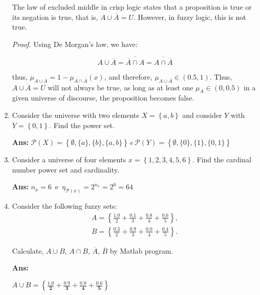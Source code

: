\documentclass{article}
\begin{document}
\begin{enumerate}
        The law of excluded middle in crisp logic states that a proposition is true or its negation is true, that is, \(A \cup \overline{A} = U\). However, in fuzzy logic, this is not true.

        \textit{Proof.} Using De Morgan's law, we have:

        \[
          A \cup \overline{A} = \overline{\overline{A} \cap A} = \overline{A \cap \overline{A}}
        \]

        thus, \({\mu}_{A \cup \overline{A}} = 1 - {\mu}_{{A \cap \overline{A}}}(x)\), and therefore, \({\mu}_{A \cup \overline{A}} \in (0.5, 1)\). Thus, \(A \cup \overline{A} = U\) will not always be true, as long as at least one \({\mu}_{A} \in (0, 0.5)\) in a given universe of discourse, the proposition becomes false.

  \item Consider the universe with two elements $X = \left\{a, b\right\}$ and consider $Y$ with $Y = \left\{0, 1\right\}$. Find the power set.

        \textbf{Ans:}
        $
          \mathcal{P}(X) = \left\{\emptyset, \{a\}, \{b\}, \{a, b\}\right\} \, e \, \mathcal{P}(Y) = \left\{\emptyset, \{0\}, \{1\}, \{0, 1\}\right\}
        $

  \item Consider a universe of four elements $x = \left\{1, 2, 3, 4, 5, 6\right\}$. Find the cardinal number power set and cardinality.

        \textbf{Ans:}
        $
          n_{x} = 6 \, \text{ e } \, \eta_{\mathcal{P}(x)} = 2 ^ {n_x} = 2 ^ 6 = 64
        $

  \item Consider the following fuzzy sets:
        \begin{gather*}
          A = \left\{
          \frac{1.0}{2} +
          \frac{0.1}{3} +
          \frac{0.8}{4} +
          \frac{0.6}{5}
          \right\}, \\[12pt]
          B = \left\{
          \frac{0.3}{2} +
          \frac{0.9}{3} +
          \frac{0.0}{4} +
          \frac{0.4}{5}
          \right\}.
        \end{gather*}

        Calculate, $A \cup B$, $A \cap B$, $\overline{A}$, $\overline{B}$ by Matlab program.

        \textbf{Ans:}

        $
          A \cup B \boldsymbol{=
            \left\{
            \frac{1.0}{2} +
            \frac{0.9}{3} +
            \frac{0.8}{4} +
            \frac{0.6}{5}
            \right\}}
        $


\end{enumerate}
\end{document}

